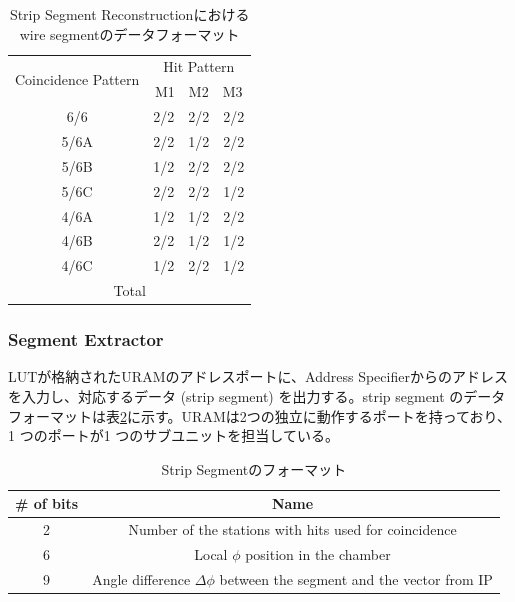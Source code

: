 \begin{table}[]
    \centering
    \caption{Strip Segment Reconstructionにおけるwire segmentのデータフォーマット}
    \label{tab:SegmentReco_strip}
    \begin{tabular}{|cc|}
    \hline
    \multicolumn{1}{|c|}{\multirow{2}{*}{Coincidence Pattern}} & Hit Pattern \\ \cline{2-2} 
    \multicolumn{1}{|c|}{}                                     & M1　M2　M3    \\ \hline\hline
    \multicolumn{1}{|c|}{6/6}                                  & 2/2　2/2　2/2 \\ \hline
    \multicolumn{1}{|c|}{5/6A}                                 & 2/2　1/2　2/2 \\ \hline
    \multicolumn{1}{|c|}{5/6B}                                 & 1/2　2/2　2/2 \\ \hline
    \multicolumn{1}{|c|}{5/6C}                                 & 2/2　2/2　1/2 \\ \hline
    \multicolumn{1}{|c|}{4/6A}                                 & 1/2　1/2　2/2 \\ \hline
    \multicolumn{1}{|c|}{4/6B}                                 & 2/2　1/2　1/2 \\ \hline
    \multicolumn{1}{|c|}{4/6C}                                 & 1/2　2/2　1/2 \\ \hline\hline
    \multicolumn{2}{|c|}{Total}                                              \\ \hline
    \end{tabular}
\end{table}

\subsubsection*{Segment Extractor}
LUTが格納されたURAMのアドレスポートに、Address Specifierからのアドレスを入力し、対応するデータ (strip segment) を出力する。strip segment のデータフォーマットは表\ref{tab:StripSegment}に示す。URAMは2つの独立に動作するポートを持っており、1 つのポートが1 つのサブユニットを担当している。


\begin{table}[]
    \centering
    \caption{Strip Segmentのフォーマット}
    \label{tab:StripSegment}
    \begin{tabular}{|c|c|}
    \hline
    \# of bits & Name                                                                     \\ \hline\hline
    2          & Number of the stations with hits used for coincidence                    \\ \hline
    6          & Local $\phi$ position in the chamber                                     \\ \hline
    9          & Angle difference $\Delta\phi$ between the segment and the vector from IP \\ \hline
    \end{tabular}
\end{table}

